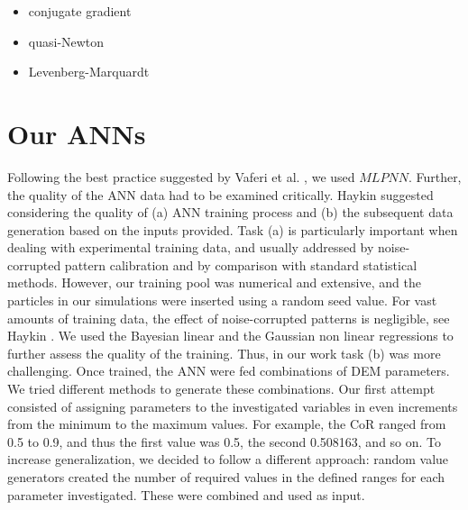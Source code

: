 
\begin{itemize}
  \item{conjugate gradient }
  \item{quasi-Newton}
  \item{Levenberg-Marquardt}
\end{itemize}

\section{Our ANNs}
\label{sec:ouranns}


Following the best practice suggested by Vaferi et al. \cite{RefWorks:150}, we
used $MLPNN$.
Further, the quality of the \acs{ANN} data had to be examined critically. 
Haykin \cite{RefWorks:158} 
suggested considering the quality of (a) \acs{ANN} training process and (b) the
subsequent data generation based on the inputs provided.
Task (a) is particularly important
when dealing with experimental training data, and
usually addressed
by noise-corrupted pattern calibration
and by comparison with standard statistical methods.
However, our training pool was numerical and extensive, 
and the particles in our simulations were inserted using a random
seed value.
For vast amounts of training data, the effect of noise-corrupted patterns is
negligible, see Haykin \cite{RefWorks:158}.
We used the Bayesian linear and the Gaussian non linear regressions to further
assess the quality of the training.
Thus, in our work task (b) was more challenging.
Once trained, the \acs{ANN} were fed
combinations of \acs{DEM} parameters. 
We tried different methods to generate these combinations. 
Our first attempt consisted of assigning parameters to the investigated
variables in even increments from the minimum to the maximum values. 
For example, the \acs{CoR} ranged from 0.5 to 0.9, and thus the first value was
0.5, the second 0.508163, and so on.
To increase generalization, we decided to follow a different approach: 
random value generators created the number of required values in the defined
ranges for each parameter investigated.
These were combined and used as input.\\
